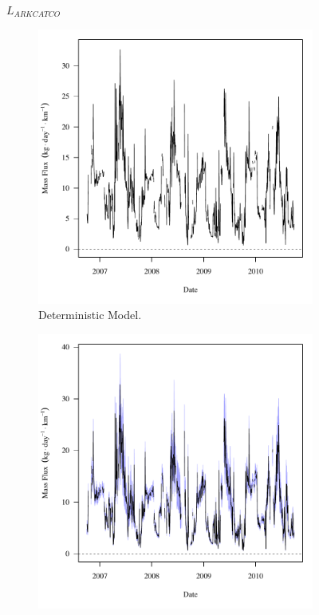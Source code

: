 \subfiguretop
\begin{landscape}
	\begin{figure}
		$ \displaystyle L_{ARKCATCO} $
		\begin{subfigure}{0.7\textwidth}
			\centering
			\includegraphics[width=\tableCustomSize]{"Figures/Results_USR/Deterministic/f U163"}
			\caption{Deterministic Model.}
		\end{subfigure}%
		\begin{subfigure}{0.7\textwidth}
			\centering
			\includegraphics[width=\tableCustomSize]{"Figures/Results_USR/Stochastic/f U163"}

\end{subfigure}
\end{figure}
\end{landscape}
